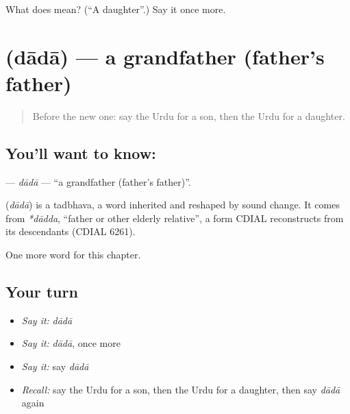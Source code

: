 \begin{tcolorbox}[breakable,colback=teal!4,colframe=teal!35!black,title={Before you move on}]
What does  mean? (\textquotedblleft{}A daughter\textquotedblright{}.) Say it once more.
\end{tcolorbox}
\section[\texorpdfstring{\ur{دادا} (dādā)}{دادا (dādā)}]{ (dādā) — a grandfather (father's father)}

\label{lesson:UR-C43-dada}



\begin{quote}
Before the new one: say the Urdu for a son, then the Urdu for a daughter.
\end{quote}

\subsection*{You'll want to know: }
\textbf{} — \emph{dādā} — \textquotedblleft{}a grandfather (father's father)\textquotedblright{}.

\begin{cousinweb}
\textbf{} (\emph{dādā}) is a tadbhava, a word inherited and reshaped by sound change. It comes from \emph{*dādda}, \textquotedblleft{}father or other elderly relative\textquotedblright{}, a form CDIAL reconstructs from its descendants (CDIAL 6261).
\end{cousinweb}

\begin{grammarlens}[title={What you've built}]
One more word for this chapter.
\end{grammarlens}

\subsection*{Your turn}
\begin{itemize}
\raggedright
  \item \emph{Say it:} \emph{dādā}
  \item \emph{Say it:} \emph{dādā}, once more
  \item \emph{Say it:} say \emph{dādā}
  \item \emph{Recall:} say the Urdu for a son, then the Urdu for a daughter, then say \emph{dādā} again
\end{itemize}

